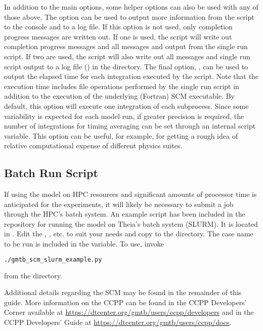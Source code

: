 In addition to the main options, some helper options can also be used with any of those above. The  option can be used to output more information from the script to the console and to a log file. If this option is not used, only completion progress messages are written out. If one  is used, the script will write out completion progress messages and all messages and output from the single run script. If two  are used, the script will also write out all messages and single run script output to a log file () in the  directory. The final option, , can be used to output the elapsed time for each integration executed by the script. Note that the execution time includes file operations performed by the single run script in addition to the execution of the underlying (Fortran) SCM executable. By default, this option will execute one integration of each subprocess. Since some variability is expected for each model run, if greater precision is required, the number of integrations for timing averaging can be set through an internal script variable. This option can be useful, for example, for getting a rough idea of relative computational expense of different physics suites.

\subsection{Batch Run Script}

If using the model on HPC resources and significant amounts of processor time is anticipated for the experiments, it will likely be necessary to submit a job through the HPC's batch system. An example script has been included in the repository for running the model on Theia's batch system (SLURM). It is located in . Edit the , , etc. to suit your needs and copy to the  directory. The case name to be run is included in the  variable. To use, invoke
\begin{lstlisting}[language=bash]
./gmtb_scm_slurm_example.py
\end{lstlisting}
from the  directory.

Additional details regarding the SCM may be found in the remainder of this guide. More information on the CCPP can be found in the CCPP Developers' Corner available at \url{https://dtcenter.org/gmtb/users/ccpp/developers} and in the CCPP Developers' Guide at \url{https://dtcenter.org/gmtb/users/ccpp/docs}.
